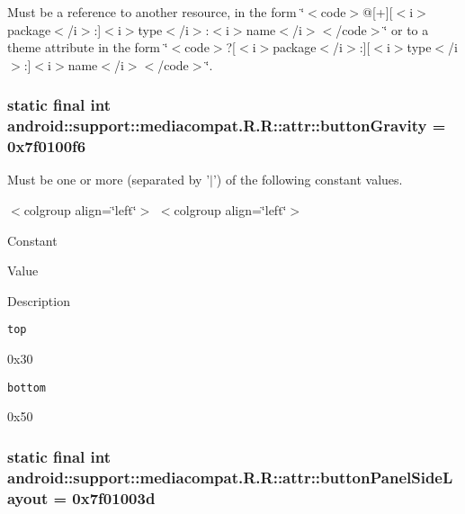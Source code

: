 Must be a reference to another resource, in the form \char`\"{}$<$code$>$@\mbox{[}+\mbox{]}\mbox{[}$<$i$>$package$<$/i$>$:\mbox{]}$<$i$>$type$<$/i$>$:$<$i$>$name$<$/i$>$$<$/code$>$\char`\"{} or to a theme attribute in the form \char`\"{}$<$code$>$?\mbox{[}$<$i$>$package$<$/i$>$:\mbox{]}\mbox{[}$<$i$>$type$<$/i$>$:\mbox{]}$<$i$>$name$<$/i$>$$<$/code$>$\char`\"{}. \hypertarget{classandroid_1_1support_1_1mediacompat_1_1_r_1_1attr_f9e5dc06672303485d31549b5c333e35}{
\subsubsection[{buttonGravity}]{\setlength{\rightskip}{0pt plus 5cm}static final int android::support::mediacompat.R.R::attr::buttonGravity = 0x7f0100f6}}
\label{classandroid_1_1support_1_1mediacompat_1_1_r_1_1attr_f9e5dc06672303485d31549b5c333e35}


Must be one or more (separated by '$|$') of the following constant values. \begin{TabularC}{0}
\hline
\end{TabularC}
$<$colgroup align=\char`\"{}left\char`\"{}$>$ $<$colgroup align=\char`\"{}left\char`\"{}$>$ 

Constant

Value

Description 

{\tt top}

0x30

{\tt bottom}

0x50\hypertarget{classandroid_1_1support_1_1mediacompat_1_1_r_1_1attr_de5c388ff7c067fda14f5ee16a6c8c66}{
\subsubsection[{buttonPanelSideLayout}]{\setlength{\rightskip}{0pt plus 5cm}static final int android::support::mediacompat.R.R::attr::buttonPanelSideLayout = 0x7f01003d}}
\label{classandroid_1_1support_1_1mediacompat_1_1_r_1_1attr_de5c388ff7c067fda14f5ee16a6c8c66}


